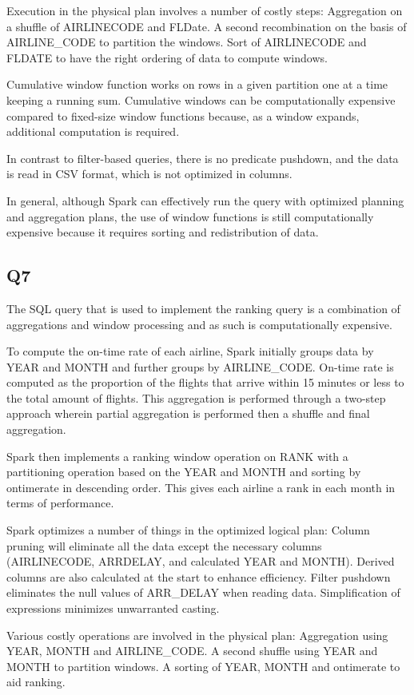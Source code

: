 \documentclass{article}
\begin{document}
Execution in the physical plan involves a number of costly steps:
Aggregation on a shuffle of AIRLINECODE and FLDate.
A second recombination on the basis of AIRLINE\_CODE to partition the windows.
Sort of AIRLINECODE and FLDATE to have the right ordering of data to compute windows.

Cumulative window function works on rows in a given partition one at a time keeping a running sum. Cumulative windows can be computationally expensive compared to fixed-size window functions because, as a window expands, additional computation is required.

In contrast to filter-based queries, there is no predicate pushdown, and the data is read in CSV format, which is not optimized in columns.

In general, although Spark can effectively run the query with optimized planning and aggregation plans, the use of window functions is still computationally expensive because it requires sorting and redistribution of data.
\subsection{Q7}
The SQL query that is used to implement the ranking query is a combination of aggregations and window processing and as such is computationally expensive.

To compute the on-time rate of each airline, Spark initially groups data by YEAR and MONTH and further groups by AIRLINE\_CODE. On-time rate is computed as the proportion of the flights that arrive within 15 minutes or less to the total amount of flights. This aggregation is performed through a two-step approach wherein partial aggregation is performed then a shuffle and final aggregation.

Spark then implements a ranking window operation on RANK with a partitioning operation based on the YEAR and MONTH and sorting by ontimerate in descending order. This gives each airline a rank in each month in terms of performance.

Spark optimizes a number of things in the optimized logical plan:
Column pruning will eliminate all the data except the necessary columns (AIRLINECODE, ARRDELAY, and calculated YEAR and MONTH).
Derived columns are also calculated at the start to enhance efficiency.
Filter pushdown eliminates the null values of ARR\_DELAY when reading data.
Simplification of expressions minimizes unwarranted casting.

Various costly operations are involved in the physical plan:
Aggregation using YEAR, MONTH and AIRLINE\_CODE.
A second shuffle using YEAR and MONTH to partition windows.
A sorting of YEAR, MONTH and ontimerate to aid ranking.
\end{document}
